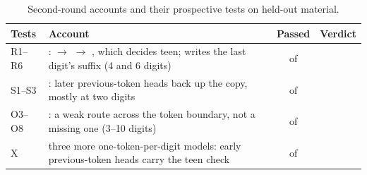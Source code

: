\begin{table}[H]
\centering\small
\caption{Second-round accounts and their prospective tests on held-out material.}
\label{tab:d4-r2tests}
\begin{tabularx}{\linewidth}{@{}l Y c c@{}}
\toprule
Tests & Account & Passed & Verdict \\
\midrule
R1--R6 & \qsix{}:  $\to$  $\to$ , which decides teen;  writes the last digit's suffix (4 and 6 digits) &  of  &  \\
S1--S3 & \qsix{}: later previous-token heads back up the copy, mostly at two digits &  of  &  \\
O3--O8 & \olmo{}: a weak route across the token boundary, not a missing one (3--10 digits) &  of  &  \\
X & three more one-token-per-digit models: early previous-token heads carry the teen check &  of  &  \\
\bottomrule
\end{tabularx}
\end{table}
